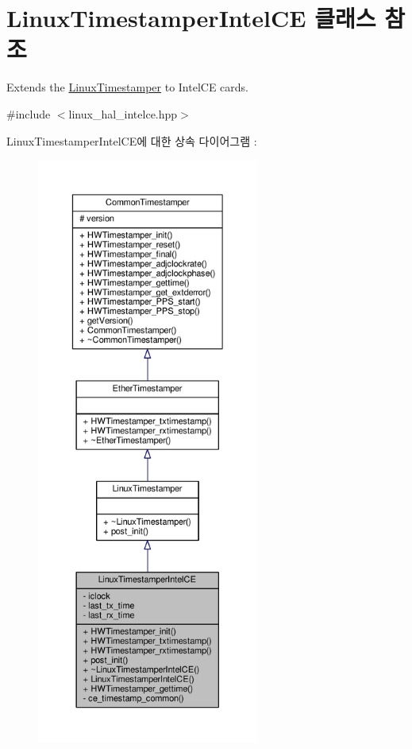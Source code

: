 \hypertarget{class_linux_timestamper_intel_c_e}{}\section{Linux\+Timestamper\+Intel\+CE 클래스 참조}
\label{class_linux_timestamper_intel_c_e}


Extends the \hyperlink{class_linux_timestamper}{Linux\+Timestamper} to Intel\+CE cards.  




{\ttfamily \#include $<$linux\+\_\+hal\+\_\+intelce.\+hpp$>$}



Linux\+Timestamper\+Intel\+C\+E에 대한 상속 다이어그램 \+: 
\nopagebreak
\begin{figure}[H]
\begin{center}
\leavevmode
\includegraphics[height=550pt]{class_linux_timestamper_intel_c_e__inherit__graph}
\end{center}
\end{figure}


